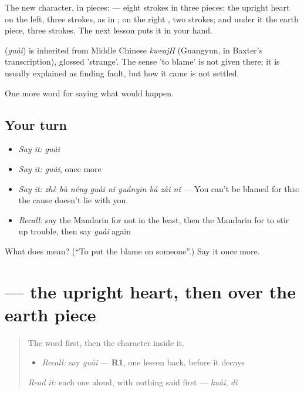The new character, in pieces:  — eight strokes in three pieces: the upright heart on the left, three strokes, as in ; on the right , two strokes; and under it the earth piece, three strokes. The next lesson puts it in your hand.

\begin{cousinweb}
\textbf{} (\emph{guài}) is inherited from Middle Chinese \emph{kweajH} (Guangyun, in Baxter's transcription), glossed 'strange'. The sense 'to blame' is not given there; it is usually explained as finding fault, but how it came is not settled.
\end{cousinweb}

\begin{grammarlens}[title={What you've built}]
One more word for saying what would happen.
\end{grammarlens}

\subsection*{Your turn}
\begin{itemize}
\raggedright
  \item \emph{Say it:} \emph{guài}
  \item \emph{Say it:} \emph{guài}, once more
  \item \emph{Say it:} \emph{zhè bù néng guài nǐ yuányīn bú zài nǐ} — You can't be blamed for this: the cause doesn't lie with you.
  \item \emph{Recall:} say the Mandarin for not in the least, then the Mandarin for to stir up trouble, then say \emph{guài} again
\end{itemize}

\begin{tcolorbox}[breakable,colback=teal!4,colframe=teal!35!black,title={Before you move on}]
What does  mean? (\textquotedblleft{}To put the blame on someone\textquotedblright{}.) Say it once more.
\end{tcolorbox}
\section[\texorpdfstring{\zh{怪} (guài)}{怪 (guài)}]{ — the upright heart, then  over the earth piece}

\label{lesson:ZH-W539-guai}



\begin{quote}
The word first, then the character inside it.

\begin{itemize}
\raggedright
  \item \emph{Recall:} say \emph{guài} — \textbf{R1}, one lesson back, before it decays
\end{itemize}

\begin{quote}
 
\end{quote}

\emph{Read it:} each one aloud, with nothing said first — \emph{kuài}, \emph{dì}
\end{quote}

